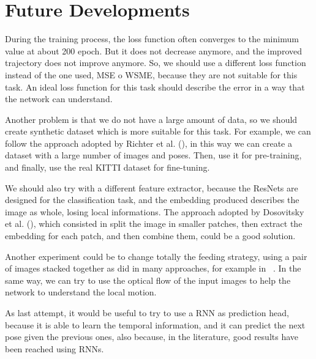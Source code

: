\section{Future Developments}\label{sec:future-developments}

During the training process, the loss function often converges to the minimum value at about 200 epoch.
But it does not decrease anymore, and the improved trajectory does not improve anymore.
So, we should use a different loss function instead of the one used, MSE o WSME, because they are not suitable for this task.
An ideal loss function for this task should describe the error in a way that the network can understand.

Another problem is that we do not have a large amount of data, so we should create synthetic dataset which is more suitable for this task.
For example, we can follow the approach adopted by Richter et al. (\cite{synthetic_dataset}), in this way we can create a dataset with a large number of images and poses.
Then, use it for pre-training, and finally, use the real KITTI dataset for fine-tuning.

We should also try with a different feature extractor, because the ResNets are designed for the classification task, and the embedding produced describes the image as whole, losing local informations.
The approach adopted by Dosovitsky et al. (\cite{vit_paper}), which consisted in split the image in smaller patches, then extract the embedding for each patch, and then combine them, could be a good solution.

Another experiment could be to change totally the feeding strategy, using a pair of images stacked together as did in many approaches, for example in ~\cite{deep_vo}.
In the same way, we can try to use the optical flow of the input images to help the network to understand the local motion.

As last attempt, it would be useful to try to use a RNN as prediction head, because it is able to learn the temporal information, and it can predict the next pose given the previous ones, also because, in the literature, good results have been reached using RNNs.